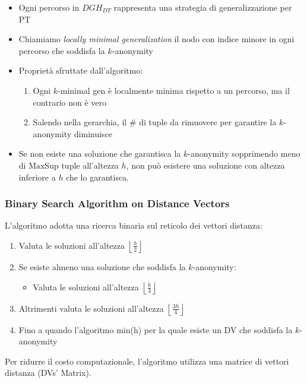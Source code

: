 \documentclass{report}
\begin{document}
\begin{itemize}
    \item Ogni percorso in $ DGH_{DT} $ rappresenta una strategia di generalizzazione per \( \text{PT} \)
    \item Chiamiamo \textit{locally minimal generalization} il nodo con indice minore in ogni percorso che soddisfa la \( k \)-anonymity
    \item Proprietà sfruttate dall'algoritmo:
    \begin{enumerate}
        \item Ogni \( k \)-minimal gen è localmente minima rispetto a un percorso, ma il contrario non è vero
        \item Salendo nella gerarchia, il \# di tuple da rimuovere per garantire la \( k \)-anonymity diminuisce
    \end{enumerate}
    \item Se non esiste una soluzione che garantisca la \( k \)-anonymity sopprimendo meno di \( \text{MaxSup} \) tuple all'altezza \( h \), non può esistere una soluzione con altezza inferiore a \( h \) che lo garantisca.
\end{itemize}

\subsubsection{Binary Search Algorithm on Distance Vectors}
L'algoritmo adotta una ricerca binaria sul reticolo dei vettori distanza:

\begin{enumerate}
    \item Valuta le soluzioni all'altezza \( \left\lfloor \frac{h}{2} \right\rfloor \)
    \item Se esiste almeno una soluzione che soddisfa la \( k \)-anonymity:
    \begin{itemize}
        \item Valuta le soluzioni all'altezza \( \left\lfloor \frac{h}{4} \right\rfloor \)
    \end{itemize}
    \item Altrimenti valuta le soluzioni all'altezza \( \left\lfloor \frac{3h}{4} \right\rfloor \)
    \item Fino a quando l'algoritmo min(h) per la quale esiste un DV che soddisfa la \( k \)-anonymity
\end{enumerate}

\noindent Per ridurre il costo computazionale, l'algoritmo utilizza una matrice di vettori distanza (DVs' Matrix).
\end{document}
